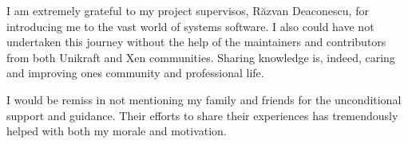 \vspace*{7cm}
\begin{center}
I am extremely grateful to my project supervisos, Răzvan Deaconescu, for introducing me to the vast world of systems software.
I also could have not undertaken this journey without the help of the maintainers and contributors from both Unikraft and Xen communities.
Sharing knowledge is, indeed, caring and improving ones community and professional life.
\end{center}
\vspace{0.6cm}
\begin{center}
I would be remiss in not mentioning my family and friends for the unconditional support and guidance.
Their efforts to share their experiences has tremendously helped with both my morale and motivation.
\end{center}
